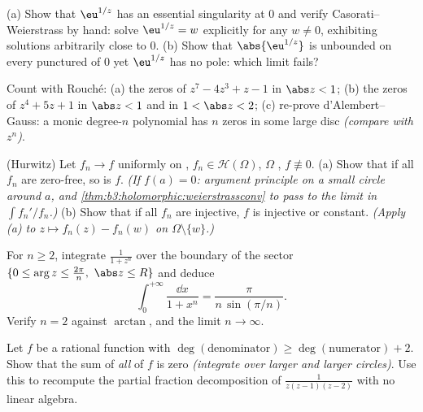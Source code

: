 \begin{exercise}[$\star\star$]\label{exo:b3:residues:6}
(a) Show that $\eu^{1/z}$ has an essential singularity at $0$
and verify Casorati--Weierstrass by hand: solve $\eu^{1/z} =
w$ explicitly for any $w \neq 0$, exhibiting solutions
arbitrarily close to $0$.
(b) Show that $\abs{\eu^{1/z}}$ is unbounded on every
punctured  of $0$ yet $\eu^{1/z}$ has no pole:
which limit fails?
\end{exercise}

\begin{exercise}[$\star\star$]\label{exo:b3:residues:7}
Count with Rouch\'e:
(a) the zeros of $z^7 - 4z^3 + z - 1$ in $\abs z < 1$;
(b) the zeros of $z^4 + 5z + 1$ in $\abs z < 1$ and in $1 <
\abs z < 2$;
(c) re-prove d'Alembert--Gauss: a monic degree-$n$ polynomial
has $n$ zeros in some large disc \emph{(compare with
$z^n$)}.
\end{exercise}

\begin{exercise}[$\star\star\star$]\label{exo:b3:residues:8}
(Hurwitz) Let $f_n \to f$ uniformly on , $f_n \in
\mathcal H(\Omega)$, $\Omega$ , $f \not\equiv 0$.
(a) Show that if all $f_n$ are zero-free, so is $f$.
\emph{(If $f(a) = 0$: argument principle on a small circle
around $a$, and \cref{thm:b3:holomorphic:weierstrassconv} to
pass to the limit in $\int f_n'/f_n$.)}
(b) Show that if all $f_n$ are injective, $f$ is injective or
constant. \emph{(Apply (a) to $z \mapsto f_n(z) - f_n(w)$ on
$\Omega\setminus\{w\}$.)}
\end{exercise}

\begin{exercise}[$\star\star\star$]\label{exo:b3:residues:9}
For $n \geq 2$, integrate $\frac1{1 + z^n}$ over the boundary
of the sector $\{0 \leq \arg z \leq \frac{2\pi}n,\ \abs z
\leq R\}$ and deduce
\[
\int_0^{+\infty}\frac{\dd x}{1 + x^n} =
\frac{\pi}{n\,\sin(\pi/n)} .
\]
Verify $n = 2$ against $\arctan$, and the limit $n \to
\infty$.
\end{exercise}

\begin{exercise}[$\star\star$]\label{exo:b3:residues:10}
Let $f$ be a rational function with $\deg(\text{denominator})
\geq \deg(\text{numerator}) + 2$. Show that the sum of
\emph{all}  of $f$ is zero \emph{(integrate over
larger and larger circles)}. Use this to recompute the partial
fraction decomposition of $\frac1{z(z-1)(z-2)}$ with no linear
algebra.
\end{exercise}

